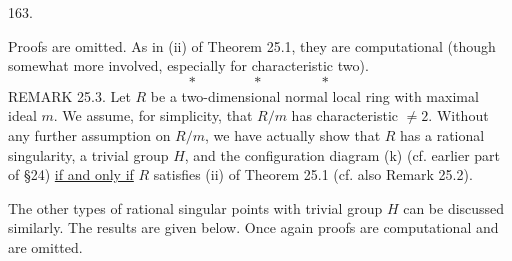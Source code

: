 163.

Proofs are omitted. As in (ii) of Theorem 25.1, they are computational (though somewhat more involved, especially for characteristic two).
\[
*\qquad\qquad *\qquad\qquad *
\]
REMARK 25.3. Let $R$ be a two-dimensional normal local ring with maximal ideal $m$. We assume, for simplicity, that $R/m$ has characteristic $\ne2$. Without any further assumption on $R/m$, we have actually show that $R$ has a rational singularity, a trivial group $H$, and the configuration diagram (k) (cf. earlier part of \S24) \uline{if and only if} $R$ satisfies (ii) of Theorem 25.1 (cf. also Remark 25.2).

The other types of rational singular points with trivial group $H$ can be discussed similarly. The results are given below. Once again proofs are computational and are omitted.

